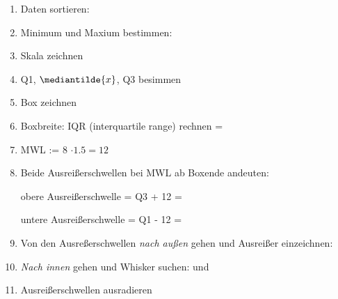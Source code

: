 \begin{enumerate}

\item Daten sortieren: 

\item Minimum und Maxium bestimmen: 

\item Skala zeichnen

\item Q1, $\mediantilde{x}$, Q3 besimmen

\item Box zeichnen

\item Boxbreite: IQR (interquartile range) rechnen =
\item MWL := 8 $\cdot{} 1.5 = 12$
  
\item Beide Ausreißerschwellen bei MWL ab Boxende andeuten:

  obere Ausreißerschwelle = Q3 + 12 = 

  untere Ausreißerschwelle = Q1 - 12 = 

  \item Von den Ausreßerschwellen \textit{nach außen} gehen und
    Ausreißer einzeichnen: 

  \item \textit{Nach innen} gehen und Whisker suchen:
     und 
    
  \item Ausreißerschwellen ausradieren
\end{enumerate}



\newpage

